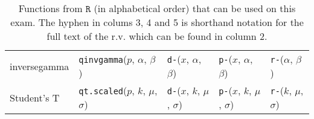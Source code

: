 \begin{table}[b]
\begin{tabular}{l | llll}
inversegamma & \texttt{qinvgamma}($p$, $\alpha$, $\beta$) 
& \texttt{d-}($x$, $\alpha$, $\beta$)
& \texttt{p-}($x$, $\alpha$, $\beta$) 
& \texttt{r-}($\alpha$, $\beta$) \\




Student's T & \texttt{qt.scaled}($p$, $k$, $\mu$, $\sigma$) 
& \texttt{d-}($x$, $k$, $\mu$, $\sigma$)
& \texttt{p-}($x$, $k$, $\mu$, $\sigma$) 
& \texttt{r-}($k$, $\mu$, $\sigma$) \\



\end{tabular}
\caption{Functions from $\texttt{R}$ (in alphabetical order) that can be used on this exam. The hyphen in colums 3, 4 and 5 is shorthand notation for the full text of the r.v. which can be found in column 2.
}
\label{tab:eqs}
\end{table}